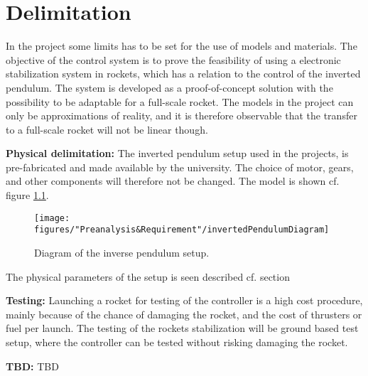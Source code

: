 \chapter{Delimitation}
In the project some limits has to be set for the use of models and materials. The objective of the control system is to prove the feasibility of using a electronic stabilization system in rockets, which has a relation to the control of the inverted pendulum. The system is developed as a proof-of-concept solution with the possibility to be adaptable for a full-scale rocket. The models in the project can only be approximations of reality, and it is therefore observable that the transfer to a full-scale rocket will not be linear though.        

\textbf{Physical delimitation:}
The inverted pendulum setup used in the projects, is pre-fabricated and made available by the university. The choice of motor, gears, and other components will therefore not be changed. The model is shown cf. figure \ref{fig:InvertedPendulum1}.

\begin{figure} [htbp]
	\centering
	\texttt{[image: figures/"Preanalysis\&Requirement"/invertedPendulumDiagram]}
	\caption{Diagram of the inverse pendulum setup.} \label{fig:InvertedPendulum1}
\end{figure}
	
The physical parameters of the setup is seen described cf. section 

\textbf{Testing:}
Launching a rocket for testing of the controller is a high cost procedure, mainly because of the chance of damaging the rocket, and the cost of thrusters or fuel per launch. The testing of the rockets stabilization will be ground based test setup, where the controller can be tested without risking damaging the rocket.  

\textbf{TBD:}
TBD